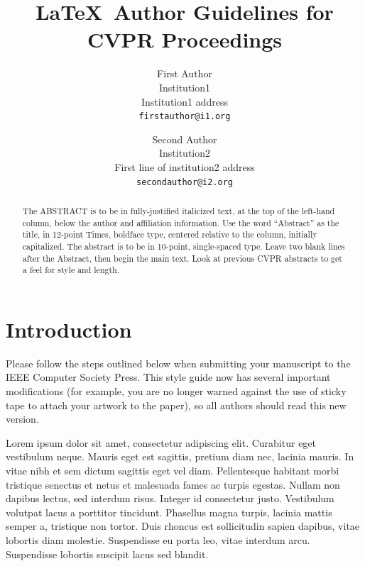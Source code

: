 \documentclass[10pt,twocolumn,letterpaper]{article}
\begin{document}
\title{\LaTeX\ Author Guidelines for CVPR Proceedings}

\author{First Author\\
Institution1\\
Institution1 address\\
{\tt\small firstauthor@i1.org}
\and
Second Author\\
Institution2\\
First line of institution2 address\\
{\tt\small secondauthor@i2.org}
}

\maketitle

\begin{abstract}
   The ABSTRACT is to be in fully-justified italicized text, at the top
   of the left-hand column, below the author and affiliation
   information. Use the word ``Abstract'' as the title, in 12-point
   Times, boldface type, centered relative to the column, initially
   capitalized. The abstract is to be in 10-point, single-spaced type.
   Leave two blank lines after the Abstract, then begin the main text.
   Look at previous CVPR abstracts to get a feel for style and length.
\end{abstract}

\section{Introduction}

Please follow the steps outlined below when submitting your manuscript to
the IEEE Computer Society Press.  This style guide now has several
important modifications (for example, you are no longer warned against the
use of sticky tape to attach your artwork to the paper), so all authors
should read this new version.



Lorem ipsum dolor sit amet, consectetur adipiscing elit. Curabitur eget vestibulum neque. Mauris eget est sagittis, pretium diam nec, lacinia mauris. In vitae nibh et sem dictum sagittis eget vel diam. Pellentesque habitant morbi tristique senectus et netus et malesuada fames ac turpis egestas. Nullam non dapibus lectus, sed interdum risus. Integer id consectetur justo. Vestibulum volutpat lacus a porttitor tincidunt. Phasellus magna turpis, lacinia mattis semper a, tristique non tortor. Duis rhoncus est sollicitudin sapien dapibus, vitae lobortis diam molestie. Suspendisse eu porta leo, vitae interdum arcu. Suspendisse lobortis suscipit lacus sed blandit.
\end{document}
